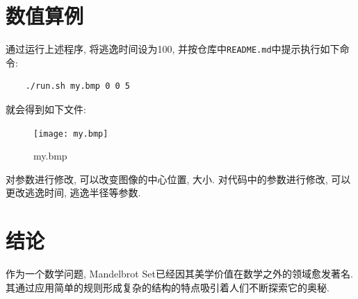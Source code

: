 \documentclass{ctexart}
\begin{document}
\section{数值算例}
通过运行上述程序, 将逃逸时间设为100, 并按仓库中\verb!README.md!中提示执行如下命令: 
\begin{verbatim}
    ./run.sh my.bmp 0 0 5
\end{verbatim}
\par 就会得到如下文件: 
\begin{figure}[!ht]
	\centering
	\texttt{[image: my.bmp]}
	\caption{my.bmp}
\end{figure}
\par 对参数进行修改, 可以改变图像的中心位置, 大小. 对代码中的参数进行修改, 可以更改逃逸时间, 逃逸半径等参数.

\section{结论}
作为一个数学问题, Mandelbrot Set已经因其美学价值在数学之外的领域愈发著名. 其通过应用简单的规则形成复杂的结构的特点吸引着人们不断探索它的奥秘. 
\end{document}
